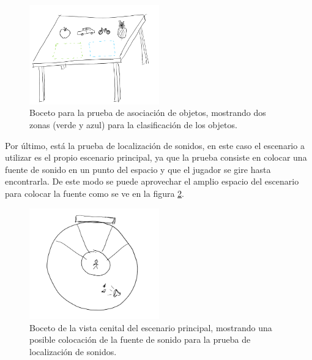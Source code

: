 \begin{figure}
  \centering
    \includegraphics[width=0.5\textwidth]{04.Desarrollo/03.Entrega3/01.Iteracion3_1/00.Figuras/10.agrupacion_objetos.png}
    \caption{Boceto para la prueba de asociación de objetos, mostrando dos zonas (verde y azul) para la clasificación de los objetos.}
    \label{fig:E3_agrupacion}
\end{figure}


Por último, está la prueba de localización de sonidos, en este caso el escenario a utilizar es el propio escenario principal, ya que la prueba consiste en colocar una fuente de sonido en un punto del espacio y que el jugador se gire hasta encontrarla. De este modo se puede aprovechar el amplio espacio del escenario para colocar la fuente como se ve en la figura \ref{fig:E3_localizacionSonido}.

\begin{figure}
  \centering
    \includegraphics[width=0.5\textwidth]{04.Desarrollo/03.Entrega3/01.Iteracion3_1/00.Figuras/11.localizacion_sonido.png}
    \caption{Boceto de la vista cenital del escenario principal, mostrando una posible colocación de la fuente de sonido para la prueba de localización de sonidos.}
    \label{fig:E3_localizacionSonido}
\end{figure}

